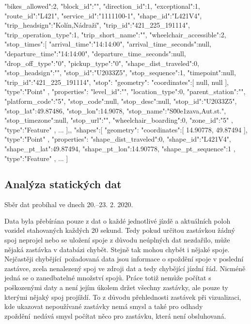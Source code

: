 \begin{code}[frame=none]
"bikes_allowed":2,
"block_id":"",
"direction_id":1,
"exceptional":1,
"route_id":"L421",
"service_id":"1111100-1",
"shape_id":"L421V4",
"trip_headsign":"Kolín,Nádraží",
"trip_id":"421_225_191114",
"trip_operation_type":1,
"trip_short_name":"",
"wheelchair_accessible":2,
"stop_times":[{
  "arrival_time":"14:14:00",
  "arrival_time_seconds":null,
  "departure_time":"14:14:00",
  "departure_time_seconds":null,
  "drop_off_type":"0",
  "pickup_type":"0",
  "shape_dist_traveled":0,
  "stop_headsign":"",
  "stop_id":"U2033Z5",
  "stop_sequence":1,
  "timepoint":null,
  "trip_id":"421_225_191114",
  "stop":{
    "geometry":{
      "coordinates":[
        null,
        null
      ],
      "type":"Point"
    },
    "properties":{
      "level_id":"",
      "location_type":0,
      "parent_station":"",
      "platform_code":"5",
      "stop_code":null,
      "stop_desc":null,
      "stop_id":"U2033Z5",
      "stop_lat":49.87486,
      "stop_lon":14.9078,
      "stop_name":"S\u00e1zava,Aut.st.",
      "stop_timezone":null,
      "stop_url":"",
      "wheelchair_boarding":0,
      "zone_id":"5"
    },
    "type":"Feature"
  },
  ...
],},
"shapes":[{
  "geometry":{
    "coordinates":[
      14.90778,
      49.87494
    ],
    "type":"Point"
  },
  "properties":{
    "shape_dist_traveled":0,
    "shape_id":"L421V4",
    "shape_pt_lat":49.87494,
    "shape_pt_lon":14.90778,
    "shape_pt_sequence":1
  },
  "type":"Feature"
},
...
]

\end{code}

\subsection{Analýza statických dat}

Sběr dat probíhal ve dnech 20.--23. 2. 2020.

\bigbreak

Data byla přebírána pouze z dat o každé jednotlivé jízdě a aktuálních poloh vozidel stahovaných každých 20 sekund. Tedy pokud určitou zastávkou žádný spoj neprojel nebo se uložení spoje z důvodu neúplných dat nezdařilo, může nějaká zastávka v databázi chybět. Stejně tak mohou chybět i nějaké spoje. Nejčastěji chybějící požadovaná data jsou informace o spoždění spoje v poslední zastávce, zcela nenalezený spoj ve zdroji dat a tedy chybějící jízdní řád. Nicméně jedná se o zanedbatelné množství spojů. Práce totiž nemůže počítat s poškozenými daty a není jejím úkolem držet všechny zastávky, ale pouze ty kterými nějaký spoj projíždí. To z důvodu přehlednosti zastávek při vizualizaci, kde ukazovat nepoužívané zastávky nemá smysl a také pro odhady zpoždění nedává smysl počítat něco pro zastávku, která není obsluhovaná.

